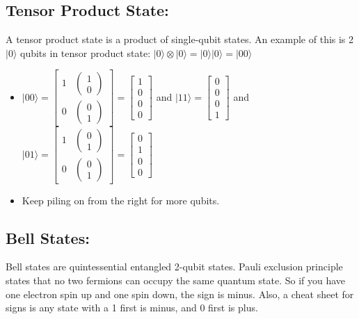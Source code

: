 \documentclass{article}
\begin{document}
\subsection{Tensor Product State:}
A tensor product state is a product of single-qubit states. An example of this is 2 \(|0\rangle\) qubits in tensor product state: \(|0\rangle \otimes |0\rangle = |0\rangle |0\rangle = |00\rangle\)
\begin{itemize}
    \item \(|00\rangle = \begin{bmatrix} 1 & \begin{pmatrix} 1 \\ 0 \end{pmatrix} \\ 0 & \begin{pmatrix} 0 \\ 1 \end{pmatrix} \end{bmatrix} = \begin{bmatrix} 1 \\ 0 \\ 0 \\ 0 \end{bmatrix}\) and \(|11\rangle = \begin{bmatrix} 0 \\ 0 \\ 0 \\ 1 \end{bmatrix}\) and \(|01\rangle = \begin{bmatrix} 1 & \begin{pmatrix} 0 \\ 1 \end{pmatrix} \\ 0 & \begin{pmatrix} 0 \\ 1 \end{pmatrix} \end{bmatrix} = \begin{bmatrix} 0 \\ 1 \\ 0 \\ 0 \end{bmatrix}\)
    \item Keep piling on from the right for more qubits.
\end{itemize}
\subsection{Bell States:}
Bell states are quintessential entangled 2-qubit states. Pauli exclusion principle states that no two fermions can occupy the same quantum state. So if you have one electron spin up and one spin down, the sign is minus. Also, a cheat sheet for signs is any state with a 1 first is minus, and 0 first is plus.
\end{document}
